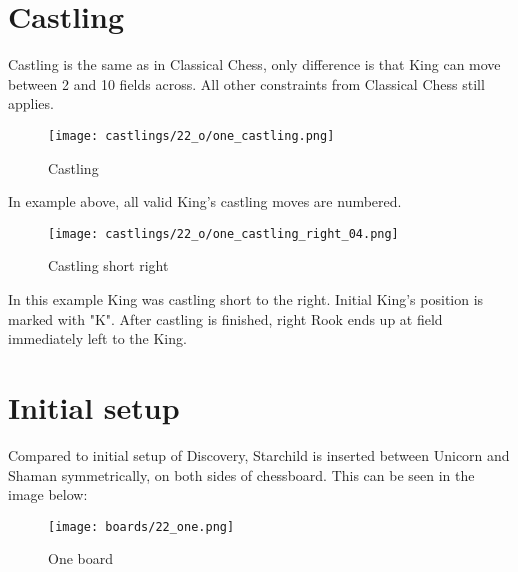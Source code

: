 \clearpage %

\section*{Castling}

Castling is the same as in Classical Chess, only difference is that King can move between 2 and 10 fields across.
All other constraints from Classical Chess still applies.

\noindent
\begin{figure}[!h]
\texttt{[image: castlings/22\_o/one\_castling.png]}
\caption{Castling}
\label{fig:one_castling}
\end{figure}

In example above, all valid King's castling moves are numbered.

\noindent
\begin{figure}[!h]
\texttt{[image: castlings/22\_o/one\_castling\_right\_04.png]}
\caption{Castling short right}
\label{fig:one_castling_right_04}
\end{figure}

In this example King was castling short to the right. Initial King's position is marked with "K".
After castling is finished, right Rook ends up at field immediately left to the King.

\clearpage %

\section*{Initial setup}

Compared to initial setup of Discovery, Starchild is inserted between Unicorn and Shaman
symmetrically, on both sides of chessboard. This can be seen in the image below:

\noindent
\begin{figure}[h]
\texttt{[image: boards/22\_one.png]}
\caption{One board}
\label{fig:22_one}
\end{figure}

\clearpage %
